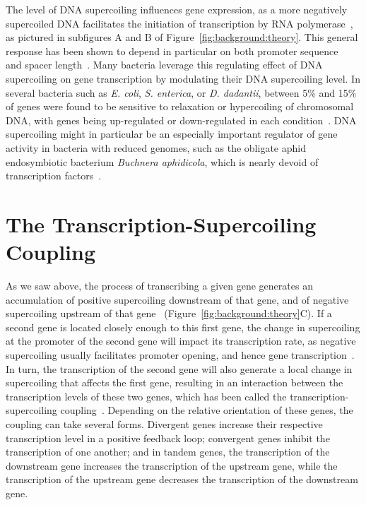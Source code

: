 The level of DNA supercoiling influences gene expression, as a more negatively supercoiled DNA facilitates the initiation of transcription by RNA polymerase~\citep{elhoudaigui2019}, as pictured in subfigures A and B of Figure~\ref{fig:background:theory}.
This general response has been shown to depend in particular on both promoter sequence~\citep{forquet2021} and spacer length~\citep{forquet2022}.
Many bacteria leverage this regulating effect of DNA supercoiling on gene transcription by modulating their DNA supercoiling level.
In several bacteria such as \emph{E. coli}, \emph{S. enterica}, or \emph{D. dadantii}, between 5\% and 15\% of genes were found to be sensitive to relaxation or hypercoiling of chromosomal DNA, with genes being up-regulated or down-regulated in each condition~\citep{peter2004, ferrandiz2010, webber2013, pineau2022a}.
DNA supercoiling might in particular be an especially important regulator of gene activity in bacteria with reduced genomes, such as the obligate aphid endosymbiotic bacterium \emph{Buchnera aphidicola}, which is nearly devoid of transcription factors~\citep{brinza2013}.

\section{The Transcription-Supercoiling Coupling}

As we saw above, the process of transcribing a given gene generates an accumulation of positive supercoiling downstream of that gene, and of negative supercoiling upstream of that gene~\citep{liu1987,visser2022} (Figure~\ref{fig:background:theory}C).
If a second gene is located closely enough to this first gene, the change in supercoiling at the promoter of the second gene will impact its transcription rate, as negative supercoiling usually facilitates promoter opening, and hence gene transcription~\citep{forquet2021}.
In turn, the transcription of the second gene will also generate a local change in supercoiling that affects the first gene, resulting in an interaction between the transcription levels of these two genes, which has been called the transcription-supercoiling coupling~\citep{meyer2014}.
Depending on the relative orientation of these genes, the coupling can take several forms.
Divergent genes increase their respective transcription level in a positive feedback loop; convergent genes inhibit the transcription of one another; and in tandem genes, the transcription of the downstream gene increases the transcription of the upstream gene, while the transcription of the upstream gene decreases the transcription of the downstream gene.

